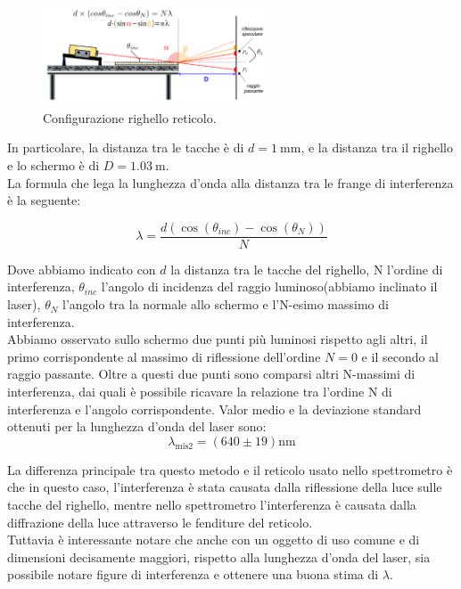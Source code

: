 \documentclass[letterpaper,12pt]{article}
\begin{document}
\begin{figure}[h!]
    \centering
    \includegraphics[width=0.6\textwidth]{Righello_config.png}
    \caption{Configurazione righello reticolo.}
    \label{fig:Righello_config}
\end{figure}

In particolare, la distanza tra le tacche è di $d = \SI{1}{\milli\meter}$, e la distanza tra il righello e lo 
schermo è di $D = \SI{1.03}{\meter}$.\\
La formula che lega la lunghezza d'onda alla distanza tra le frange di interferenza è la seguente:

\begin{equation}
    \lambda = \frac{d (\cos(\theta_{inc})-\cos(\theta_N))}{N}
    \label{eq:lunghezza_onda}
\end{equation}

Dove abbiamo indicato con $d$ la distanza tra le tacche del righello, N l'ordine di interferenza, $\theta_{inc}$ 
l'angolo di incidenza del raggio luminoso(abbiamo inclinato il laser), $\theta_N$ l'angolo tra la normale allo schermo e l'N-esimo massimo di 
interferenza.\\

Abbiamo osservato sullo schermo due punti più luminosi rispetto agli altri, il primo corrispondente al massimo di riflessione dell'ordine $N = 0$ e il secondo al raggio passante.
Oltre a questi due punti sono comparsi altri N-massimi di interferenza, dai quali è possibile ricavare la relazione tra l'ordine N di interferenza e l'angolo corrispondente.
Valor medio e la deviazione standard ottenuti per la lunghezza d'onda del laser sono:
$$ \lambda_\text{mis2}= (640 \pm 19) \text{nm}$$

La differenza principale tra questo metodo e il reticolo usato nello spettrometro è che in questo caso, l'interferenza è stata causata
dalla riflessione della luce sulle tacche del righello, mentre nello spettrometro l'interferenza è causata dalla diffrazione della luce
attraverso le fenditure del reticolo.\\
Tuttavia è interessante notare che anche con un oggetto di uso comune e di dimensioni decisamente maggiori, rispetto alla lunghezza d'onda del laser, sia possibile 
notare figure di interferenza e ottenere una buona stima di $\lambda$.
\end{document}
